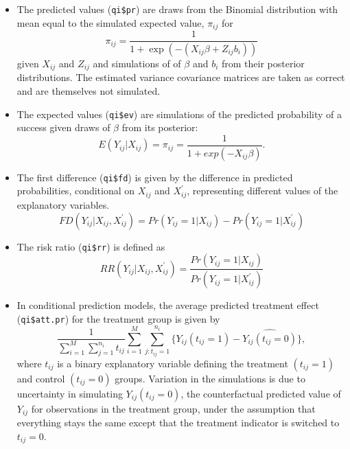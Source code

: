\begin{itemize}
\item The predicted values ({\tt qi\$pr}) are draws from the Binomial distribution with mean equal to the simulated expected value, $\pi_{ij}$ for
\begin{equation*}
\pi_{ij} = \frac{1}{1 + \exp(-(X_{ij} \beta + Z_{ij} b_i))}
\end{equation*}
given $X_{ij}$ and $Z_{ij}$ and simulations of of $\beta$ and $b_i$ from their posterior distributions. The estimated variance covariance matrices are taken as correct and are themselves not simulated.

\item The expected values ({\tt qi\$ev}) are simulations of the predicted probability of a success given draws of $\beta$ from its posterior:
\begin{equation*}
E(Y_{ij} | X_{ij}) = \pi_{ij} = \frac{1}{1 + exp(- X_{ij} \beta)}.
\end{equation*}

\item The first difference ({\tt qi\$fd}) is given by the difference in predicted probabilities, conditional on $X_{ij}$ and $X_{ij}^\prime$, representing different values of the explanatory variables.
\begin{equation*}
FD(Y_{ij} | X_{ij}, X_{ij}^\prime) = Pr(Y_{ij} = 1 | X_{ij}) - Pr(Y_{ij} = 1 | X_{ij}^\prime)
\end{equation*}

\item The risk ratio ({\tt qi\$rr}) is defined as
\begin{equation*}
RR(Y_{ij} | X_{ij}, X_{ij}^{\prime}) = \frac{Pr(Y_{ij} = 1 | X_{ij})}{Pr(Y_{ij} = 1 | X_{ij}^{\prime})}
\end{equation*}

\item In conditional prediction models, the average predicted treatment effect ({\tt qi\$att.pr}) for the treatment group is given by
\begin{equation*}
\frac{1}{\sum_{i = 1}^M \sum_{j = 1}^{n_i} t_{ij}} \sum_{i = 1}^M \sum_{j:t_{ij} = 1}^{n_i} \{ Y_{ij} (t_{ij} = 1) - \widehat{Y_{ij}(t_{ij} = 0)} \},
\end{equation*}
where $t_{ij}$ is a binary explanatory variable defining the treatment $(t_{ij} = 1)$ and control $(t_{ij} = 0)$ groups. Variation in the simulations is due to uncertainty in simulating $Y_{ij}(t_{ij} = 0)$, the counterfactual predicted value of $Y_{ij}$ for observations in the treatment group, under the assumption that everything stays the same except that the treatment indicator is switched to $t_{ij} = 0$.


\end{itemize}
